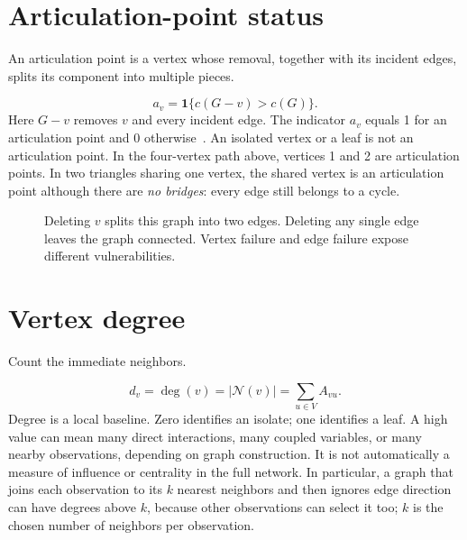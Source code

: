 \documentclass[11pt]{article}
\newcommand{\N}{\mathcal N}
\newcommand{\plain}[1]{\noindent #1\par\smallskip}
\begin{document}
\section{Articulation-point status}
\plain{An articulation point is a vertex whose removal, together with its incident edges, splits its component into multiple pieces.}
\begin{equation}
 a_v=\mathbf 1\{c(G-v)>c(G)\}.
\end{equation}
Here $G-v$ removes $v$ and every incident edge. The indicator $a_v$ equals 1 for an articulation point and 0 otherwise~\cite{nxarticulation}. An isolated vertex or a leaf is not an articulation point. In the four-vertex path above, vertices 1 and 2 are articulation points. In two triangles sharing one vertex, the shared vertex is an articulation point although there are \emph{no bridges}: every edge still belongs to a cycle.
\par
\begin{figure}[H]\centering
{}
\caption{Deleting $v$ splits this graph into two edges. Deleting any single edge leaves the graph connected. Vertex failure and edge failure expose different vulnerabilities.}
\end{figure}
\par

\clearpage
\section{Vertex degree}
\plain{Count the immediate neighbors.}
\begin{equation}
 d_v=\deg(v)=|\N(v)|=\sum_{u\in V} A_{vu}.
\end{equation}
Degree is a local baseline. Zero identifies an isolate; one identifies a leaf. A high value can mean many direct interactions, many coupled variables, or many nearby observations, depending on graph construction. It is not automatically a measure of influence or centrality in the full network. In particular, a graph that joins each observation to its $k$ nearest neighbors and then ignores edge direction can have degrees above $k$, because other observations can select it too; $k$ is the chosen number of neighbors per observation.
\end{document}

